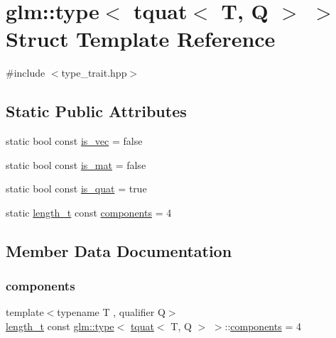 \hypertarget{structglm_1_1type_3_01tquat_3_01_t_00_01_q_01_4_01_4}{}\section{glm\+:\+:type$<$ tquat$<$ T, Q $>$ $>$ Struct Template Reference}
\label{structglm_1_1type_3_01tquat_3_01_t_00_01_q_01_4_01_4}


{\ttfamily \#include $<$type\+\_\+trait.\+hpp$>$}

\subsection*{Static Public Attributes}
\begin{DoxyCompactItemize}
\item 
static bool const \hyperlink{structglm_1_1type_3_01tquat_3_01_t_00_01_q_01_4_01_4_a512e63470e03e15c743282a72c0798f3}{is\+\_\+vec} = false
\item 
static bool const \hyperlink{structglm_1_1type_3_01tquat_3_01_t_00_01_q_01_4_01_4_ae80840fbe701f0ada0f430b4e1dae9f1}{is\+\_\+mat} = false
\item 
static bool const \hyperlink{structglm_1_1type_3_01tquat_3_01_t_00_01_q_01_4_01_4_ad8a07885504f8eb9d56e1cfbdbc10a68}{is\+\_\+quat} = true
\item 
static \hyperlink{namespaceglm_a090a0de2260835bee80e71a702492ed9}{length\+\_\+t} const \hyperlink{structglm_1_1type_3_01tquat_3_01_t_00_01_q_01_4_01_4_a4b2822c2e37012f219864ba5c49e1210}{components} = 4
\end{DoxyCompactItemize}


\subsection{Member Data Documentation}
\mbox{\label{structglm_1_1type_3_01tquat_3_01_t_00_01_q_01_4_01_4_a4b2822c2e37012f219864ba5c49e1210}} 
\subsubsection{\texorpdfstring{components}{components}}
{\footnotesize\ttfamily template$<$typename T , qualifier Q$>$ \\
\hyperlink{namespaceglm_a090a0de2260835bee80e71a702492ed9}{length\+\_\+t} const \hyperlink{structglm_1_1type}{glm\+::type}$<$ \hyperlink{structglm_1_1tquat}{tquat}$<$ T, Q $>$ $>$\+::\hyperlink{_s_d_l__opengl__glext_8h_a3824c86dfa50d23068c74eafb87375c2}{components} = 4\hspace{0.3cm}{\ttfamily [static]}}

